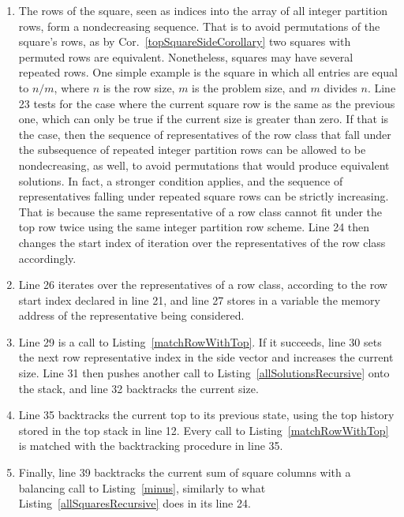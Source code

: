 \begin{enumerate}
\addtocounter{enumi}{3}
\item The rows of the square, seen as indices into the array of all integer partition rows, form a nondecreasing sequence. That is to avoid permutations of the square's rows, as by Cor.~\ref{topSquareSideCorollary} two squares with permuted rows are equivalent. Nonetheless, squares may have several repeated rows. One simple example is the square in which all entries are equal to $n / m$, where $n$ is the row size, $m$ is the problem size, and $m$ divides $n$. Line 23 tests for the case where the current square row is the same as the previous one, which can only be true if the current size is greater than zero. If that is the case, then the sequence of representatives of the row class that fall under the subsequence of repeated integer partition rows can be allowed to be nondecreasing, as well, to avoid permutations that would produce equivalent solutions. In fact, a stronger condition applies, and the sequence of representatives falling under repeated square rows can be strictly increasing. That is because the same representative of a row class cannot fit under the top row twice using the same integer partition row scheme. Line 24 then changes the start index of iteration over the representatives of the row class accordingly.
\addtocounter{enumi}{2}
\item Line 26 iterates over the representatives of a row class, according to the row start index declared in line 21, and line 27 stores in a variable the memory address of the representative being considered.
\addtocounter{enumi}{2}
\item Line 29 is a call to Listing~\ref{matchRowWithTop}. If it succeeds, line 30 sets the next row representative index in the side vector and increases the current size. Line 31 then pushes another call to Listing~\ref{allSolutionsRecursive} onto the stack, and line 32 backtracks the current size.
\addtocounter{enumi}{5}
\item Line 35 backtracks the current top to its previous state, using the top history stored in the top stack in line 12. Every call to Listing~\ref{matchRowWithTop} is matched with the backtracking procedure in line 35.
\addtocounter{enumi}{3}
\item Finally, line 39 backtracks the current sum of square columns with a balancing call to Listing~\ref{minus}, similarly to what Listing~\ref{allSquaresRecursive} does in its line 24.
\end{enumerate}


